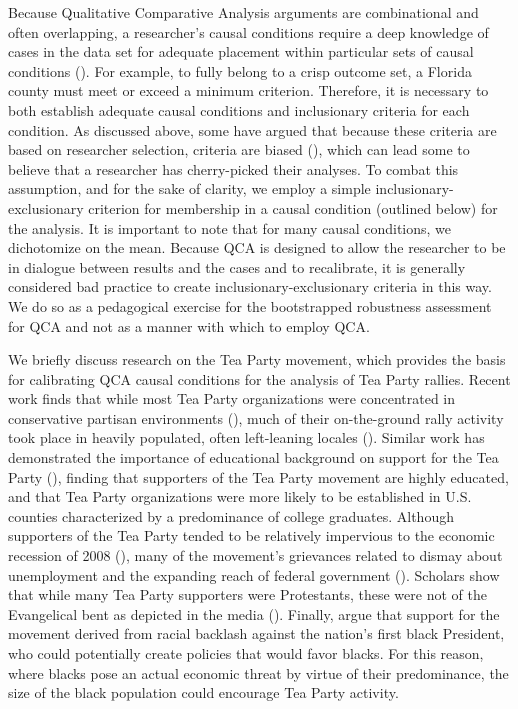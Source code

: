 \documentclass[12pt]{article}
\begin{document}
{{{{Because Qualitative Comparative Analysis arguments are combinational and often overlapping, a researcher's causal conditions require a deep knowledge of cases in the data set for adequate placement within particular sets of causal conditions (\citealt{ragin_2008}). For example, to fully belong to a crisp outcome set, a Florida county must meet or exceed a minimum criterion. Therefore, it is necessary to both establish adequate causal conditions and inclusionary criteria for each condition. As discussed above, some have argued that because these criteria are based on researcher selection, criteria are biased (\citealt{lieberson_2004}), which can lead some to believe that a researcher has cherry-picked their analyses. To combat this assumption, and for the sake of clarity, we employ a simple inclusionary-exclusionary criterion for membership in a causal condition (outlined below) for the analysis. It is important to note that for many causal conditions, we dichotomize on the mean. Because QCA is designed to allow the researcher to be in dialogue between results and the cases and to recalibrate, it is generally considered bad practice to create inclusionary-exclusionary criteria in this way. We do so as a pedagogical exercise for the bootstrapped robustness assessment for QCA and not as a manner with which to employ QCA.

We briefly discuss research on the Tea Party movement, which provides the basis for calibrating QCA causal conditions for the analysis of Tea Party rallies. Recent work finds that while most Tea Party organizations were concentrated in conservative partisan environments (\citealt{mcveigh_et_al_2014a,skocpol_and_williamson_2012}), much of their on-the-ground rally activity took place in heavily populated, often left-leaning locales (\citealt{skocpol_and_williamson_2012,zernike_2010}). Similar work has demonstrated the importance of educational background on support for the Tea Party (\citealt{mcveigh_et_al_2014a,skocpol_and_williamson_2012}), finding that supporters of the Tea Party movement are highly educated, and that Tea Party organizations were more likely to be established in U.S. counties characterized by a predominance of college graduates. Although supporters of the Tea Party tended to be relatively impervious to the economic recession of 2008 (\citealt{skocpol_and_williamson_2012,parker_and_barreto_2013}), many of the movement's grievances related to dismay about unemployment and the expanding reach of federal government (\citealt{skocpol_and_williamson_2012,mcveigh_et_al_2014a,parker_and_barreto_2013}). Scholars show that while many Tea Party supporters were Protestants, these were not of the Evangelical bent as depicted in the media (\citealt{zernike_2010,skocpol_and_williamson_2012,mcveigh_et_al_2014a}). Finally, \citet{parker_and_barreto_2013} argue that support for the movement derived from racial backlash against the nation's first black President, who could potentially create policies that would favor blacks. For this reason, where blacks pose an actual economic threat by virtue of their predominance, the size of the black population could encourage Tea Party activity. 

}}}}
\end{document}
